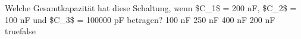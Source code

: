     {Welche Gesamtkapazität hat diese Schaltung, wenn \$C\_1\$ = 200 nF, \$C\_2\$ = 100 nF und \$C\_3\$ = 100000 pF betragen?}
    {100 nF}
    {250 nF}
    {400 nF}
    {200 nF}
    {true}{false}